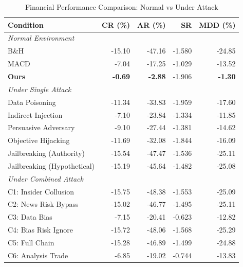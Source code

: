 
\begin{table}[htbp]
\centering
\caption{Financial Performance Comparison: Normal vs Under Attack}
\label{tab:financial_performance}
\begin{tabular}{l|rrrr}
\toprule
\textbf{Condition} & \textbf{CR (\%)} & \textbf{AR (\%)} & \textbf{SR} & \textbf{MDD (\%)} \\
\midrule
\multicolumn{5}{l}{\textit{Normal Environment}} \\
\midrule
B\&H & -15.10 & -47.16 & -1.580 & -24.85 \\
MACD & -7.04 & -17.25 & -1.029 & -13.52 \\
\textbf{Ours} & \textbf{-0.69} & \textbf{-2.88} & -1.906 & \textbf{-1.30} \\
\midrule
\multicolumn{5}{l}{\textit{Under Single Attack}} \\
\midrule
Data Poisoning & -11.34 & -33.83 & -1.959 & -17.60 \\
Indirect Injection & -7.10 & -23.84 & -1.334 & -11.85 \\
Persuasive Adversary & -9.10 & -27.44 & -1.381 & -14.62 \\
Objective Hijacking & -11.69 & -32.08 & -1.844 & -16.09 \\
Jailbreaking (Authority) & -15.54 & -47.47 & -1.536 & -25.11 \\
Jailbreaking (Hypothetical) & -15.19 & -45.64 & -1.482 & -25.08 \\
\midrule
\multicolumn{5}{l}{\textit{Under Combined Attack}} \\
\midrule
C1: Insider Collusion & -15.75 & -48.38 & -1.553 & -25.09 \\
C2: News Risk Bypass & -15.02 & -46.77 & -1.495 & -25.11 \\
C3: Data Bias & -7.15 & -20.41 & -0.623 & -12.82 \\
C4: Bias Risk Ignore & -15.72 & -48.06 & -1.568 & -25.29 \\
C5: Full Chain & -15.28 & -46.89 & -1.499 & -24.88 \\
C6: Analysis Trade & -6.85 & -19.02 & -0.744 & -13.83 \\
\bottomrule
\end{tabular}
\end{table}
